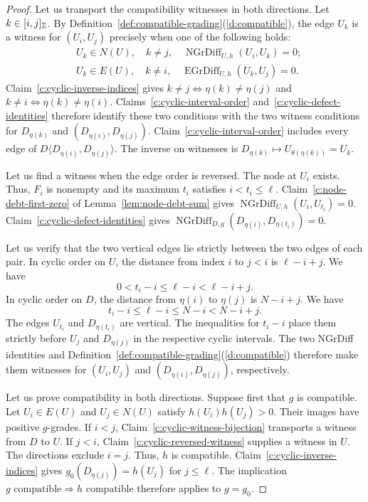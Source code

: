 \begin{proof}
 Let us transport the compatibility witnesses in both directions.
Let $k\in[i,j]_{\mathbb Z}$.
By Definition~\ref{def:compatible-grading}(\ref{d:compatible}), the edge $U_k$ is a witness for $(U_i,U_j)$ precisely when one of the following holds:
\[
 \begin{aligned}
 &U_k\in N(U),\quad k\ne j,\quad \operatorname{NGrDiff}_{U,h}(U_i,U_k)=0;\\
 &U_k\in E(U),\quad k\ne i,\quad \operatorname{EGrDiff}_{U,h}(U_k,U_j)=0.
 \end{aligned}
\]
Claim~\ref{c:cyclic-inverse-indices} gives $k\ne j\Longleftrightarrow\eta(k)\ne\eta(j)$ and $k\ne i\Longleftrightarrow\eta(k)\ne\eta(i)$.
Claims~\ref{c:cyclic-interval-order} and~\ref{c:cyclic-defect-identities} therefore identify these two conditions with the two witness conditions for $D_{\eta(k)}$ and $(D_{\eta(i)},D_{\eta(j)})$.
Claim~\ref{c:cyclic-interval-order} includes every edge of $D\langle D_{\eta(i)},D_{\eta(j)}\rangle$.
The inverse on witnesses is $D_{\eta(k)}\mapsto U_{\theta(\eta(k))}=U_k$.

 Let us find a witness when the edge order is reversed.
The node at $U_i$ exists. Thus, $F_i$ is
nonempty and its maximum $t_i$ satisfies $i<t_i\le\ell$.
Claim~\ref{c:node-debt-first-zero} of Lemma~\ref{lem:node-debt-sum} gives
$\operatorname{NGrDiff}_{U,h}(U_i,U_{t_i})=0$.
Claim~\ref{c:cyclic-defect-identities} gives $\operatorname{NGrDiff}_{D,g}(D_{\eta(i)},D_{\eta(t_i)})=0$.

Let us verify that the two vertical edges lie strictly between the two edges of each pair.
In cyclic order on $U$, the distance from index $i$ to $j<i$ is $\ell-i+j$. We have
\[
 0<t_i-i\le\ell-i<\ell-i+j.
\]
In cyclic order on $D$, the distance from $\eta(i)$ to $\eta(j)$ is $N-i+j$. We have
\[
 t_i-i\le\ell-i\le N-i<N-i+j.
\]
The edges $U_{t_i}$ and $D_{\eta(t_i)}$ are vertical.
The inequalities for $t_i-i$ place them strictly before $U_j$ and $D_{\eta(j)}$ in the respective cyclic intervals.
The two NGrDiff identities and Definition~\ref{def:compatible-grading}(\ref{d:compatible}) therefore make them witnesses for $(U_i,U_j)$ and $(D_{\eta(i)},D_{\eta(j)})$, respectively.

 Let us prove compatibility in both directions.
Suppose first that $g$ is compatible.
Let $U_i\in E(U)$ and $U_j\in N(U)$ satisfy $h(U_i)h(U_j)>0$.
Their images have positive $g$-grades.
If $i<j$, Claim~\ref{c:cyclic-witness-bijection} transports a witness from $D$ to $U$.
If $j<i$, Claim~\ref{c:cyclic-reversed-witness} supplies a witness in $U$.
The directions exclude $i=j$. Thus, $h$ is compatible.
Claim~\ref{c:cyclic-inverse-indices} gives $g_0(D_{\eta(j)})=h(U_j)$ for $j\le\ell$.
The implication $g\text{ compatible}\Longrightarrow h\text{ compatible}$ therefore applies to $g=g_0$.


\end{proof}
